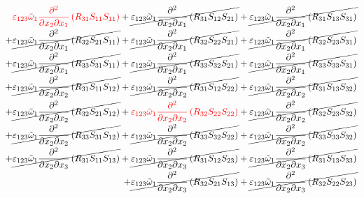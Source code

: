 \begin{equation}
	\begin{split}
{\color{red}\varepsilon_{123}\tilde{\omega}_{1}\pdv{}{x_{2}}{x_{1}}\left(R_{31}S_{11}S_{11}\right)}
		+\cancel{\varepsilon_{123}\tilde{\omega}_{1}\pdv{}{x_{2}}{x_{1}}\left(R_{31}S_{12}S_{21}\right)}
		+\cancel{\varepsilon_{123}\tilde{\omega}_{1}\pdv{}{x_{2}}{x_{1}}\left(R_{31}S_{13}S_{31}\right)}\\
		+\cancel{\varepsilon_{123}\tilde{\omega}_{1}\pdv{}{x_{2}}{x_{1}}\left(R_{32}S_{21}S_{11}\right)}
		+\cancel{\varepsilon_{123}\tilde{\omega}_{1}\pdv{}{x_{2}}{x_{1}}\left(R_{32}S_{22}S_{21}\right)}
		+\cancel{\varepsilon_{123}\tilde{\omega}_{1}\pdv{}{x_{2}}{x_{1}}\left(R_{32}S_{23}S_{31}\right)}\\
		+\cancel{\varepsilon_{123}\tilde{\omega}_{1}\pdv{}{x_{2}}{x_{1}}\left(R_{33}S_{31}S_{11}\right)}
		+\cancel{\varepsilon_{123}\tilde{\omega}_{1}\pdv{}{x_{2}}{x_{1}}\left(R_{33}S_{32}S_{21}\right)}
		+\cancel{\varepsilon_{123}\tilde{\omega}_{1}\pdv{}{x_{2}}{x_{1}}\left(R_{33}S_{33}S_{31}\right)}\\
		+\cancel{\varepsilon_{123}\tilde{\omega}_{1}\pdv{}{x_{2}}{x_{2}}\left(R_{31}S_{11}S_{12}\right)}
		+\cancel{\varepsilon_{123}\tilde{\omega}_{1}\pdv{}{x_{2}}{x_{2}}\left(R_{31}S_{12}S_{22}\right)}
		+\cancel{\varepsilon_{123}\tilde{\omega}_{1}\pdv{}{x_{2}}{x_{2}}\left(R_{31}S_{13}S_{32}\right)}\\
		+\cancel{\varepsilon_{123}\tilde{\omega}_{1}\pdv{}{x_{2}}{x_{2}}\left(R_{32}S_{21}S_{12}\right)}
		+{\color{red}\varepsilon_{123}\tilde{\omega}_{1}\pdv{}{x_{2}}{x_{2}}\left(R_{32}S_{22}S_{22}\right)}
		+\cancel{\varepsilon_{123}\tilde{\omega}_{1}\pdv{}{x_{2}}{x_{2}}\left(R_{32}S_{23}S_{32}\right)}\\
		+\cancel{\varepsilon_{123}\tilde{\omega}_{1}\pdv{}{x_{2}}{x_{2}}\left(R_{33}S_{31}S_{12}\right)}
		+\cancel{\varepsilon_{123}\tilde{\omega}_{1}\pdv{}{x_{2}}{x_{2}}\left(R_{33}S_{32}S_{22}\right)}
		+\cancel{\varepsilon_{123}\tilde{\omega}_{1}\pdv{}{x_{2}}{x_{2}}\left(R_{33}S_{33}S_{32}\right)}\\
		+\cancel{\varepsilon_{123}\tilde{\omega}_{1}\pdv{}{x_{2}}{x_{3}}\left(R_{31}S_{11}S_{13}\right)}
		+\cancel{\varepsilon_{123}\tilde{\omega}_{1}\pdv{}{x_{2}}{x_{3}}\left(R_{31}S_{12}S_{23}\right)}
		+\cancel{\varepsilon_{123}\tilde{\omega}_{1}\pdv{}{x_{2}}{x_{3}}\left(R_{31}S_{13}S_{33}\right)}\\
		+\cancel{\varepsilon_{123}\tilde{\omega}_{1}\pdv{}{x_{2}}{x_{3}}\left(R_{32}S_{21}S_{13}\right)}
		+\cancel{\varepsilon_{123}\tilde{\omega}_{1}\pdv{}{x_{2}}{x_{3}}\left(R_{32}S_{22}S_{23}\right)}

\end{split}
\end{equation}
